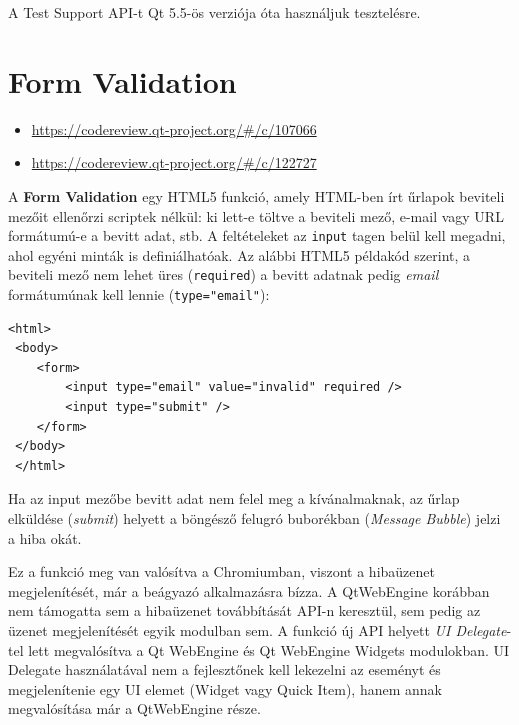 \documentclass[12pt]{report}
\let\origurl\url
\renewcommand{\url}[1]{%
    \textcolor{blue}{\origurl{#1}}
}
\newcommand{\gerrit}[1]{%
    \textcolor{qtgreen}{\origurl{https://codereview.qt-project.org/\#/c/#1}}
}
\begin{document}
A Test Support API-t Qt 5.5-ös verziója óta használjuk tesztelésre.


\section{Form Validation}

\begin{center}
    \begin{reviewbox}
        \begin{itemize}
            \renewcommand{\labelitemi}{\textcolor{qtgreen}{$\blacktriangleright$}}
            \item \gerrit{107066}
            \item \gerrit{122727}
        \end{itemize}
    \end{reviewbox}
\end{center}

\noindent
A \textbf{Form Validation} egy HTML5 funkció, amely HTML-ben írt űrlapok beviteli
mezőit ellenőrzi scriptek nélkül: ki lett-e töltve a beviteli mező, e-mail vagy URL
formátumú-e a bevitt adat, stb. A feltételeket az \texttt{input} tagen belül kell megadni,
ahol egyéni minták is definiálhatóak. Az alábbi HTML5 példakód szerint, a beviteli mező
nem lehet üres (\texttt{required}) a bevitt adatnak pedig \textit{email} formátumúnak kell
lennie (\texttt{type="email"}):
\begin{lstlisting}[title=form.html]
 <html>
 <body>
    <form>
        <input type="email" value="invalid" required />
        <input type="submit" />
    </form>
 </body>
 </html>
\end{lstlisting}
Ha az input mezőbe bevitt adat nem felel meg a kívánalmaknak, az űrlap elküldése
(\textit{submit}) helyett a böngésző felugró buborékban (\textit{Message Bubble}) jelzi a
hiba okát.

Ez a funkció meg van valósítva a Chromiumban, viszont a hibaüzenet megjelenítését, már
a beágyazó alkalmazásra bízza. A QtWebEngine korábban nem támogatta sem a hibaüzenet
továbbítását API-n keresztül, sem pedig az üzenet megjelenítését egyik modulban sem.
A funkció új API helyett \textit{UI Delegate}-tel lett megvalósítva a Qt WebEngine és
Qt WebEngine Widgets modulokban. UI Delegate használatával nem a fejlesztőnek kell lekezelni
az eseményt és megjelenítenie egy UI elemet (Widget vagy Quick Item), hanem annak
megvalósítása már a QtWebEngine része.
\end{document}
